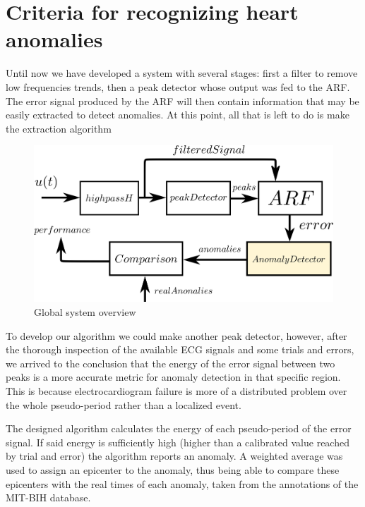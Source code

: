\documentclass[conference]{IEEEtran}
\begin{document}
\section{Criteria for recognizing heart anomalies}
Until now we have developed a system with several stages: first a filter to remove low frequencies trends, then a peak detector whose output was fed to the ARF. The error signal produced by the ARF will then contain information that may be easily extracted to detect anomalies. At this point, all that is left to do is make the extraction algorithm\par
\begin{figure}[H]
\centerline{\includegraphics[scale=0.55]{imagenes/diagram}}
\caption{Global system overview}
\label{fig}
\end{figure}

To develop our algorithm we could make another peak detector, however, after the thorough inspection of the available ECG signals and some trials and errors, we arrived to the conclusion that the energy of the error signal between two peaks is a more accurate metric for anomaly detection in that specific region. This is because electrocardiogram failure is more of a distributed problem over the whole pseudo-period rather than a localized event.\par

The designed algorithm calculates the energy of each pseudo-period of the error signal. If said energy is sufficiently high (higher than a calibrated value reached by trial and error) the algorithm reports an anomaly. A weighted average was used to assign an epicenter to the anomaly, thus being able to compare these epicenters with the real times of each anomaly, taken from the annotations of the MIT-BIH database.
\end{document}
